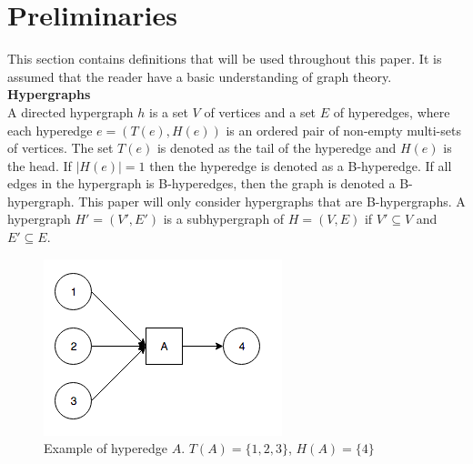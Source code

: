 \documentclass[a4paper,10pt,titlepage]{paper}
\begin{document}
\section{Preliminaries}

This section contains definitions that will be used throughout this paper. It is assumed that the reader have a basic understanding of graph theory. \\

\textbf{Hypergraphs}\\
A directed hypergraph $h$ is a set $V$ of vertices and a set $E$ of hyperedges, where each hyperedge $e=(T(e),H(e))$ is an ordered pair of non-empty multi-sets of vertices. The set $T(e)$ is denoted as the tail of the hyperedge and $H(e)$ is the head. If $|H(e)|=1$ then the hyperedge is denoted as a B-hyperedge. If all edges in the hypergraph is B-hyperedges, then the graph is denoted a B-hypergraph. This paper will only consider hypergraphs that are B-hypergraphs. A hypergraph $H' = (V',E')$ is a subhypergraph of $H=(V,E)$ if $V' \subseteq V$ and $E'\subseteq E$.\cite{Fagerberg}

\begin{figure}[H]
\centering
\includegraphics[scale=0.5]{Billeder/HyperEdge.png}
\caption{Example of hyperedge $A$. $T(A) = \{1,2,3\}$, $H(A) = \{4\}$}
\end{figure}
\end{document}

